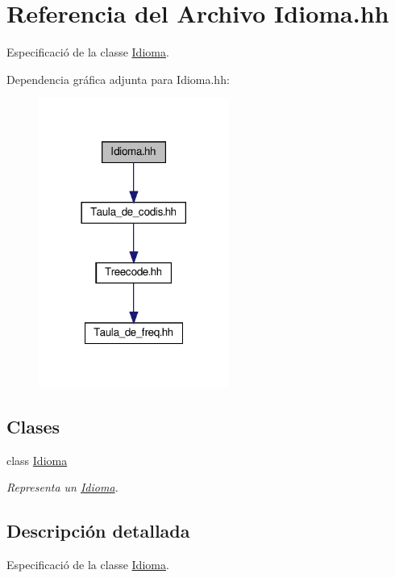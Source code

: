 \hypertarget{_idioma_8hh}{}\section{Referencia del Archivo Idioma.\+hh}
\label{_idioma_8hh}


Especificació de la classe \hyperlink{class_idioma}{Idioma}.  


Dependencia gráfica adjunta para Idioma.\+hh\+:\nopagebreak
\begin{figure}[H]
\begin{center}
\leavevmode
\includegraphics[width=177pt]{_idioma_8hh__incl}
\end{center}
\end{figure}
\subsection*{Clases}
\begin{DoxyCompactItemize}
\item 
class \hyperlink{class_idioma}{Idioma}
\begin{DoxyCompactList}\small\item\em Representa un \hyperlink{class_idioma}{Idioma}. \end{DoxyCompactList}\end{DoxyCompactItemize}


\subsection{Descripción detallada}
Especificació de la classe \hyperlink{class_idioma}{Idioma}. 

